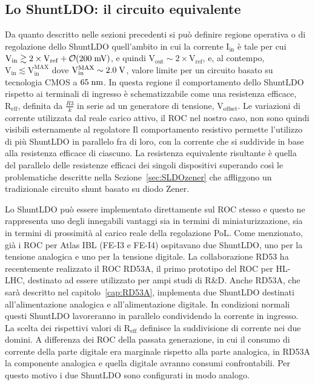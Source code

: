 \subsection{Lo ShuntLDO: il circuito equivalente}

Da quanto descritto nelle sezioni precedenti si pu\`o definire regione operativa o di regolazione dello ShuntLDO quell'ambito in cui la corrente $\mathrm{I_{in}}$ \`e tale per cui $\mathrm{V_{in}\gtrsim 2\times V_{ref}}+{\cal O}\mathrm{(200\rm \; mV)}$, e quindi $\mathrm{V_{out}\sim 2\times V_{ref}}$, e, al contempo, $\mathrm{V_{in}\lesssim V_{in}^{MAX}}$ dove $\mathrm{V_{in}^{MAX}\sim2.0\rm \; V}$, valore limite per un circuito basato su tecnologia CMOS a $65\rm \; nm$. In questa regione il comportamento dello ShuntLDO rispetto ai terminali di ingresso \`e schematizzabile come una resistenza efficace, $\mathrm{R_{eff}}$, definita da $\frac{R3}{k}$ in serie ad un generatore di tensione, $\mathrm{V_{offset}}$. Le variazioni di corrente utilizzata dal reale carico attivo, il ROC nel nostro caso, non sono quindi visibili esternamente al regolatore
Il comportamento resistivo permette l'utilizzo di più ShuntLDO in parallelo fra di loro, con la corrente che si suddivide in base alla resistenza efficace di ciascuno. La resistenza equivalente risultante \`e quella del parallelo delle resistenze efficaci dei singoli dispositivi superando cos\`i le problematiche descritte nella Sezione~\ref{sec:SLDOzener} che affliggono un tradizionale circuito shunt basato su diodo Zener.


Lo ShuntLDO pu\`o essere implementato direttamente sul ROC stesso e questo ne rappresenta uno degli innegabili vantaggi sia in termini di miniaturizzazione, sia in termini di prossimit\`a al carico reale della regolazione PoL. Come menzionato, gi\`a i ROC per Atlas IBL (FE-I3 e FE-I4) ospitavano due ShuntLDO, uno per la tensione analogica e uno per la tensione digitale. La collaborazione RD53 ha recentemente realizzato il ROC RD53A\cite{RD53A}, il primo prototipo del ROC per HL-LHC, destinato ad essere utilizzato per ampi studi di R\&D. Anche RD53A, che sar\`a descritto nel capitolo~\ref{cap:RD53A}, implementa due ShuntLDO destinati all'alimentazione analogica e all'alimentazione digitale. In condizioni normali questi ShuntLDO lavoreranno in parallelo condividendo la corrente in ingresso. La scelta dei rispettivi valori di $\mathrm{R_{eff}}$ definisce la suddivisione di corrente nei due domini. A differenza dei ROC della passata generazione, in cui il consumo di corrente della parte digitale era marginale rispetto alla parte analogica, in RD53A la componente analogica e quella digitale avranno consumi confrontabili. Per questo motivo i due ShuntLDO sono configurati in modo analogo.

